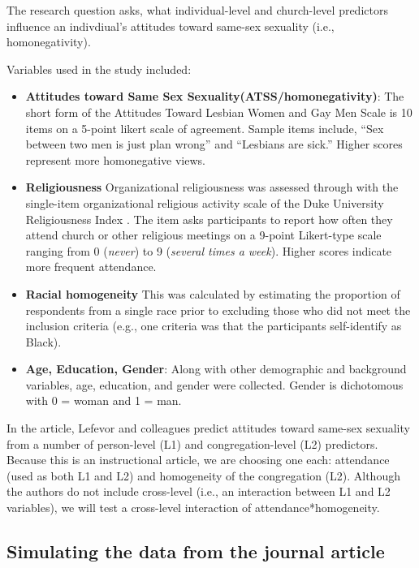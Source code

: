 \documentclass[
  english,
]{book}
\begin{document}
The research question asks, what individual-level and church-level predictors influence an indivdiual's attitudes toward same-sex sexuality (i.e., homonegativity).

Variables used in the study included:

\begin{itemize}
\item
  \textbf{Attitudes toward Same Sex Sexuality(ATSS/homonegativity)}: The short form of the Attitudes Toward Lesbian Women and Gay Men Scale \citep{herek_assessing_1994} is 10 items on a 5-point likert scale of agreement. Sample items include, ``Sex between two men is just plan wrong'' and ``Lesbians are sick.'' Higher scores represent more homonegative views.
\item
  \textbf{Religiousness} Organizational religiousness was assessed through with the single-item organizational religious activity scale of the Duke University Religiousness Index \citep{koenig_duke_2010}. The item asks participants to report how often they attend church or other religious meetings on a 9-point Likert-type scale ranging from 0 (\emph{never}) to 9 (\emph{several times a week}). Higher scores indicate more frequent attendance.
\item
  \textbf{Racial homogeneity} This was calculated by estimating the proportion of respondents from a single race prior to excluding those who did not meet the inclusion criteria (e.g., one criteria was that the participants self-identify as Black).
\item
  \textbf{Age, Education, Gender}: Along with other demographic and background variables, age, education, and gender were collected. Gender is dichotomous with 0 = woman and 1 = man.
\end{itemize}

In the article, Lefevor \citeyearpar{lefevor_homonegativity_2020} and colleagues predict attitudes toward same-sex sexuality from a number of person-level (L1) and congregation-level (L2) predictors. Because this is an instructional article, we are choosing one each: attendance (used as both L1 and L2) and homogeneity of the congregation (L2). Although the authors do not include cross-level (i.e., an interaction between L1 and L2 variables), we will test a cross-level interaction of attendance*homogeneity.

\hypertarget{simulating-the-data-from-the-journal-article}{%
\subsection{Simulating the data from the journal article}\label{simulating-the-data-from-the-journal-article}}
\end{document}

